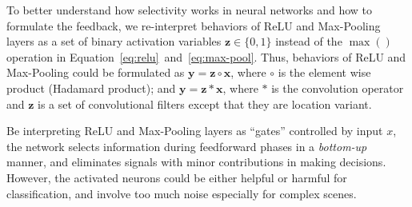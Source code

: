 {\color{red}
To better understand how selectivity works in neural networks and how to formulate the feedback, we re-interpret behaviors of ReLU and Max-Pooling layers as a set of binary activation variables $\mathbf{z} \in \{0,1\}$ instead of the $\max()$ operation in Equation~\ref{eq:relu}~and~\ref{eq:max-pool}. Thus, behaviors of ReLU and Max-Pooling could be formulated as $\mathbf{y} = \mathbf{z} \circ \mathbf{x}$, where $\circ$ is the element wise product (Hadamard product); and $\mathbf{y} = \mathbf{z} * \mathbf{x}$, where $*$ is the convolution operator and $\mathbf{z}$ is a set of convolutional filters except that they are location variant.

Be interpreting ReLU and Max-Pooling layers as ``gates'' controlled by input $x$, the network selects information during feedforward phases in a \emph{bottom-up} manner, and eliminates signals with minor contributions in making decisions. However, the activated neurons could be either helpful or harmful for classification, and involve too much noise especially for complex scenes.
}



